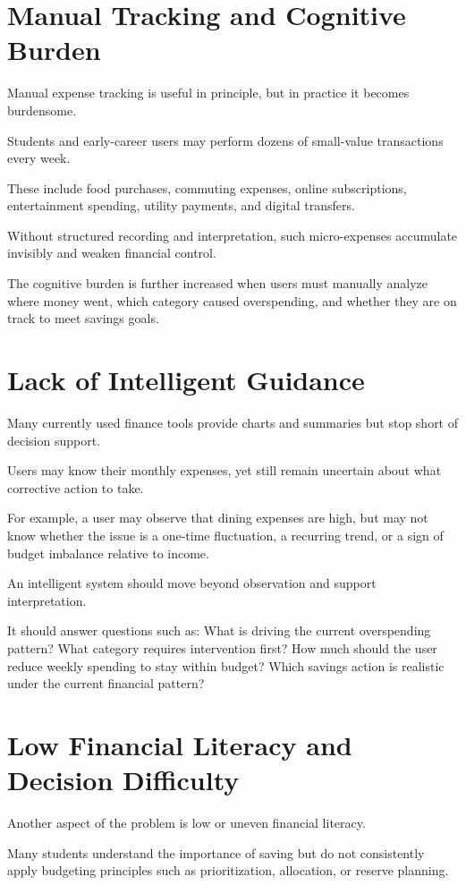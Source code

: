 \documentclass[12pt,a4paper]{report}
\begin{document}
\section{Manual Tracking and Cognitive Burden}
Manual expense tracking is useful in principle,
but in practice it becomes burdensome.

Students and early-career users may perform dozens of small-value transactions every week.

These include food purchases,
commuting expenses,
online subscriptions,
entertainment spending,
utility payments,
and digital transfers.

Without structured recording and interpretation,
such micro-expenses accumulate invisibly and weaken financial control.

The cognitive burden is further increased when users must manually analyze where money went,
which category caused overspending,
and whether they are on track to meet savings goals.

\section{Lack of Intelligent Guidance}
Many currently used finance tools provide charts and summaries but stop short of decision support.

Users may know their monthly expenses,
yet still remain uncertain about what corrective action to take.

For example,
a user may observe that dining expenses are high,
but may not know whether the issue is a one-time fluctuation,
a recurring trend,
or a sign of budget imbalance relative to income.

An intelligent system should move beyond observation and support interpretation.

It should answer questions such as:
What is driving the current overspending pattern?
What category requires intervention first?
How much should the user reduce weekly spending to stay within budget?
Which savings action is realistic under the current financial pattern?

\section{Low Financial Literacy and Decision Difficulty}
Another aspect of the problem is low or uneven financial literacy.

Many students understand the importance of saving but do not consistently apply budgeting principles such as prioritization,
allocation,
or reserve planning.
\end{document}
